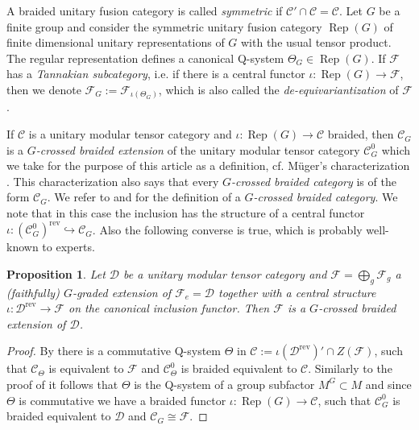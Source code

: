 \documentclass[twoside,11pt,reqno]{amsart}
\makeatletter
\newtheorem{prop}[thm]{Proposition}
\theoremstyle{definition}
\theoremstyle{remark}
\newcommand{\cF}{\mathcal{F}}
\newcommand{\cD}{\mathcal{D}}
\newcommand{\cC}{\mathcal{C}}
\DeclareMathOperator{\Rep}{Rep}
\DeclareRobustCommand{\cf}{cf.\@\xspace}
\DeclareRobustCommand{\ie}{i.e.\@\xspace}
\newcommand{\rev}[1]{{#1}^\mathrm{rev}}
\newcommand{\myemph}[1]{\emph{#1}}
\makeatother
\begin{document}
A braided unitary fusion category is called \myemph{symmetric}
if $\cC'\cap \cC=\cC$.
Let $G$ be a finite group and consider the symmetric unitary fusion category
$\Rep(G)$ of finite dimensional unitary representations of $G$ with the usual
tensor product.
The regular representation defines a canonical Q-system $\Theta_G\in \Rep(G)$.
If $\cF$ has a \myemph{Tannakian subcategory}, \ie 
if there is a central functor $\iota\colon\Rep(G)\to \cF$, then we denote 
$\cF_G:=\cF_{\iota(\Theta_G)}$, which is also called the 
\myemph{de-equivariantization} of $\cF$.

If $\cC$ is a unitary modular tensor category and $\iota\colon\Rep(G)\to\cC$ braided, then $\cC_G$ is a \emph{$G$-crossed braided extension} of 
the unitary modular tensor category $\cC_G^0$ which we take for the 
purpose of this article as a definition,
\cf M\"uger's characterization \cite[Appendix 5, Thm 4.1]{Tu2010}.
This characterization also says that every 
\myemph{$G$-crossed braided category} is of the form $\cC_G$.
We refer to \cite{Mg2005} and \cite[Appendix 5]{Tu2010} for the 
definition of a \myemph{$G$-crossed braided category}.
We note that in this case the inclusion has the structure of a 
central functor $\iota\colon\rev{(\cC^0_G)}\hookrightarrow \cC_G$.
Also the following converse is true, which is probably well-known to experts.
\begin{prop}
Let $\cD$ be a unitary modular tensor category and $\cF=\bigoplus_g \cF_g$ a 
(faithfully) $G$-graded extension of $\cF_e=\cD$ together with a 
central structure  $\iota\colon \rev{\cD}\to \cF$ on the 
canonical inclusion functor. 
Then $\cF$ is a $G$-crossed braided extension of $\cD$.
\end{prop}
\begin{proof}
By \cite[Prop.\ 5.12]{Bi2016} there is a commutative Q-system $\Theta$ 
in $\cC:=\iota(\rev{\cD})'\cap Z(\cF)$, such that $\cC_\Theta$ is equivalent 
to $\cF$ and $\cC_\Theta^0$ is braided equivalent to $\cC$.
Similarly to the proof of \cite[Prop.\ 5.17]{Bi2016} it 
follows that $\Theta$ is the Q-system of a group subfactor $M^G\subset M$
and since $\Theta$ is commutative we have a braided functor 
$\iota\colon \Rep(G)\to \cC$, such that $\cC_G^0$ is braided equivalent to 
$\cD$ and $\cC_G\cong \cF$.
\end{proof}
\end{document}
